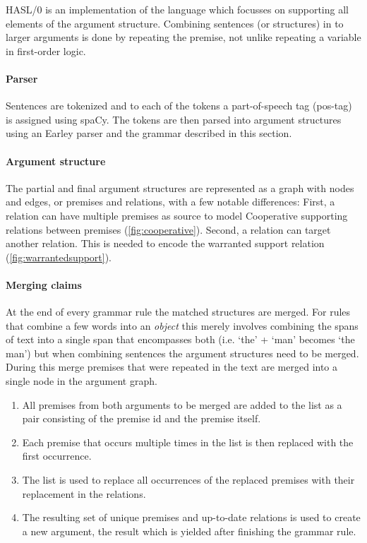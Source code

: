 HASL/0 is an implementation of the language which focusses on supporting all elements of the argument structure. Combining sentences (or structures) in to larger arguments is done by repeating the premise, not unlike repeating a variable in first-order logic.

\paragraph{Parser} Sentences are tokenized and to each of the tokens a part-of-speech tag (pos-tag) is assigned using spaCy. The tokens are then parsed into argument structures using an Earley parser and the grammar described in this section.

\paragraph{Argument structure} The partial and final argument structures are represented as a graph with nodes and edges, or premises and relations, with a few notable differences: First, a relation can have multiple premises as source to model Cooperative supporting relations between premises (\autoref{fig:cooperative}). Second, a relation can target another relation. This is needed to encode the warranted support relation (\autoref{fig:warrantedsupport}).

\paragraph{Merging claims} At the end of every grammar rule the matched structures are merged. For rules that combine a few words into an \emph{object} this merely involves combining the spans of text into a single span that encompasses both (i.e. `the' + `man' becomes `the man') but when combining sentences the argument structures need to be merged. During this merge premises that were repeated in the text are merged into a single node in the argument graph.

\begin{enumerate}
    \item All premises from both arguments to be merged are added to the list as a pair consisting of the premise id and the premise itself.
    \item Each premise that occurs multiple times in the list is then replaced with the first occurrence.
    \item The list is used to replace all occurrences of the replaced premises with their replacement in the relations.
    \item The resulting set of unique premises and up-to-date relations is used to create a new argument, the result which is yielded after finishing the grammar rule.
\end{enumerate}

